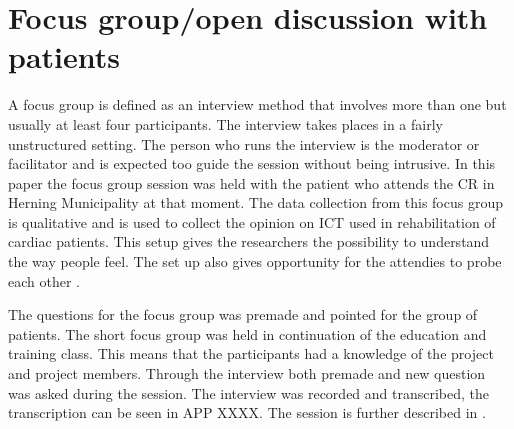 \section {Focus group/open discussion with patients} \label{focusgroup}

A focus group is defined as an interview method that involves more than one but usually at least four participants. The interview takes places in a fairly unstructured setting. The person who runs the interview is the moderator or facilitator and is expected too guide the session without being intrusive. In this paper the focus group session was held with the patient who attends the CR in Herning Municipality at that moment. The data collection from this focus group is qualitative and is used to collect the opinion on ICT used in rehabilitation of cardiac patients. This setup gives the researchers the possibility to understand the way people feel. The set up also gives opportunity for the attendies to probe each other \cite{brymanbell}. 

The questions for the focus group was premade and pointed for the group of patients. The short focus group was held in continuation of the education and training class. This means that the participants had a knowledge of the project and project members.
Through the interview both premade and new question was asked during the session. The interview was recorded and transcribed, the transcription can be seen in APP XXXX. The session is further described in . 

